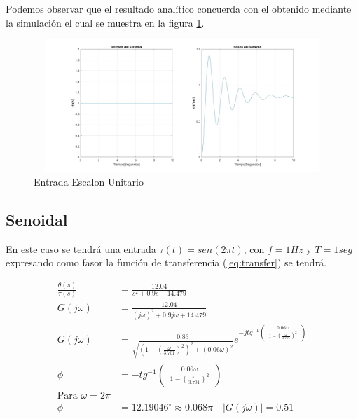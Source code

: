 \documentclass[12pt]{article}
\begin{document}
Podemos observar que el resultado analítico concuerda con el obtenido mediante la simulación el cual se muestra en la figura \ref{fig:escalon}.

\begin{figure}[h]
    \centering
    \includegraphics[width=17cm, height=5cm]{escalon.jpg}
    \caption{Entrada Escalon Unitario}
    \label{fig:escalon}
\end{figure}

\subsection{Senoidal}

En este caso se tendrá una entrada $\tau(t)=sen(2\pi t)$, con $f=1Hz$ y $T=1seg$ expresando como fasor la función de transferencia (\ref{eq:transfer}) se tendrá.

\begin{equation}
    \begin{split}
        \frac{\theta(s)}{\tau(s)}&=\frac{12.04}{s^2+0.9s+14.479}\\
        G(j\omega)&=\frac{12.04}{(j\omega)^2+0.9j\omega+14.479}\\
        G(j\omega)&=\frac{0.83}{\sqrt{(1-(\frac{\omega}{3.701})^2)^2+(0.06\omega)^2}}e^{-j tg^{-1}\begin{pmatrix} \frac{0.06\omega}{1-(\frac{\omega}{3.701})^2}\end{pmatrix}}\\
        \phi&=-tg^{-1}\begin{pmatrix} \frac{0.06\omega}{1-(\frac{\omega}{3.701})^2}\end{pmatrix}\\
        \text{Para }\omega=2\pi&\\
        \phi&=12.19046^\circ\approx 0.068\pi \quad |G(j\omega)|=0.51\\
    \end{split}
    \label{eq:fasor}
\end{equation}
\end{document}
